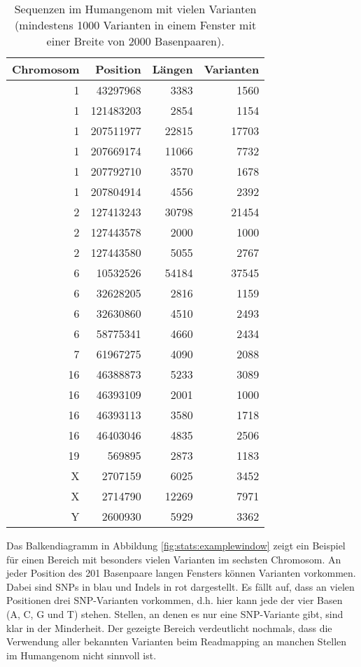 \begin{table}[hp]
\begin{center}
\begin{tabular}{|r|r|r|r|}
\hline
\textbf{Chromosom} & \textbf{Position} & \textbf{Längen} & \textbf{Varianten} \\
\hline
1 & 43297968 & 3383 & 1560 \\
1 & 121483203 & 2854 & 1154 \\
1 & 207511977 & 22815 & 17703 \\
1 & 207669174 & 11066 & 7732 \\
1 & 207792710 & 3570 & 1678 \\
1 & 207804914 & 4556 & 2392 \\
2 & 127413243 & 30798 & 21454 \\
2 & 127443578 & 2000 & 1000 \\
2 & 127443580 & 5055 & 2767 \\
6 & 10532526 & 54184 & 37545 \\
6 & 32628205 & 2816 & 1159 \\
6 & 32630860 & 4510 & 2493 \\
6 & 58775341 & 4660 & 2434 \\
7 & 61967275 & 4090 & 2088 \\
16 & 46388873 & 5233 & 3089 \\
16 & 46393109 & 2001 & 1000 \\
16 & 46393113 & 3580 & 1718 \\
16 & 46403046 & 4835 & 2506 \\
19 & 569895 & 2873 & 1183 \\
X & 2707159 & 6025 & 3452 \\
X & 2714790 & 12269 & 7971 \\
Y & 2600930 & 5929 & 3362 \\
\hline
\end{tabular}
\end{center}
\caption{Sequenzen im Humangenom mit vielen Varianten (mindestens 1000 Varianten in einem Fenster mit einer Breite von 2000 Basenpaaren).}
\label{tab:stats:manyvariants}
\end{table}

Das Balkendiagramm in Abbildung \ref{fig:stats:examplewindow} zeigt ein Beispiel für einen Bereich mit besonders vielen Varianten im sechsten Chromosom. An jeder Position des 201 Basenpaare langen Fensters können Varianten vorkommen. Dabei sind SNPs in blau und Indels in rot dargestellt. Es fällt auf, dass an vielen Positionen drei SNP-Varianten vorkommen, d.h. hier kann jede der vier Basen (A, C, G und T) stehen. Stellen, an denen es nur eine SNP-Variante gibt, sind klar in der Minderheit. Der gezeigte Bereich verdeutlicht nochmals, dass die Verwendung aller bekannten Varianten beim Readmapping an manchen Stellen im Humangenom nicht sinnvoll ist.

